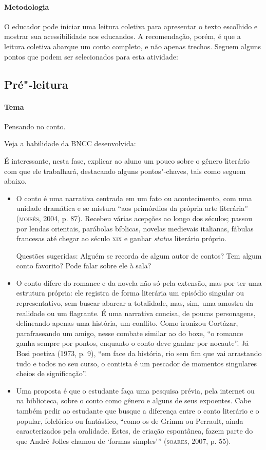 \documentclass[11pt]{extarticle}
\begin{document}
\paragraph{Metodologia}
O educador pode iniciar uma leitura coletiva para apresentar o texto
escolhido e mostrar sua acessibilidade aos educandos. A recomendação,
porém, é que a leitura coletiva abarque um conto completo, e não apenas
trechos. Seguem alguns pontos que podem ser selecionados para esta
atividade:

\subsection{Pré"-leitura}

\paragraph{Tema} Pensando no conto.

Veja a habilidade da BNCC desenvolvida:

É interessante, nesta fase, explicar ao aluno um pouco sobre o gênero
literário com que ele trabalhará, destacando alguns pontos"-chaves, tais
como seguem abaixo.

\begin{itemize}
\item O conto é uma narrativa centrada em um fato ou acontecimento, com uma
unidade dramática e se mistura ``aos primórdios da própria arte
literária'' (\textsc{moisés}, 2004, p. 87). Recebeu várias acepções ao longo dos
séculos; passou por lendas orientais, parábolas bíblicas, novelas
medievais italianas, fábulas francesas até chegar ao século \textsc{xix} e ganhar
\emph{status} literário próprio.

Questões sugeridas: Alguém se recorda de algum autor de contos? Tem
algum conto favorito? Pode falar sobre ele à sala?

\item O conto difere do romance e da novela não só pela extensão, mas por
ter uma estrutura própria: ele registra de forma literária um episódio
singular ou representativo, sem buscar abarcar a totalidade, mas, sim,
uma amostra da realidade ou um flagrante. É uma narrativa concisa, de
poucas personagens, delineando apenas uma história, um conflito. Como
ironizou Cortázar, parafraseando um amigo, nesse combate similar ao do
boxe, ``o romance ganha sempre por pontos, enquanto o conto deve ganhar
por nocaute''. Já Bosi poetiza (1973, p. 9), ``em face da história, rio
sem fim que vai arrastando tudo e todos no seu curso, o contista é um
pescador de momentos singulares cheios de significação''.

\item Uma proposta é que o estudante faça uma pesquisa prévia, pela internet 
ou na biblioteca, sobre o conto como gênero e alguns de seus expoentes.
Cabe também pedir ao estudante que busque a diferença entre o conto
literário e o popular, folclórico ou fantástico, ``como os de Grimm ou
Perrault, ainda caracterizados pela oralidade. Estes, de criação
espontânea, fazem parte do que André Jolles chamou de `formas
simples''' (\textsc{soares}, 2007, p. 55).
\end{itemize}
\end{document}
